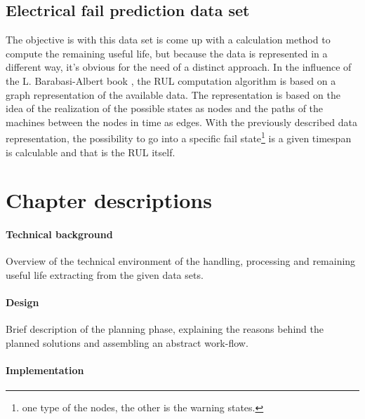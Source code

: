   \subsection{Electrical fail prediction data set}
\noindent
The objective is with this data set is come up with a calculation method to compute the remaining useful life, but because the data is represented in a different way, it's obvious for the need of a distinct approach.
\noindent
In the influence of the L. Barabasi-Albert book \cite{BALNWSCBOOK}, the RUL computation algorithm is based on a graph representation of the available data. 
\noindent
The representation is based on the idea of the realization of the possible states as nodes and the paths of the machines between the nodes in time as edges.
\noindent
With the previously described data representation, the possibility to go into a specific fail state\footnote{one type of the nodes, the other is the warning states.} is a given timespan is calculable and that is the RUL itself.

\section{Chapter descriptions}
		\paragraph{Technical background}

Overview of the technical environment of the handling, processing and remaining useful life extracting from the given data sets.

		\paragraph{Design}

Brief description of the planning phase, explaining the reasons behind the planned solutions and assembling an abstract work-flow.

		\paragraph{Implementation}

